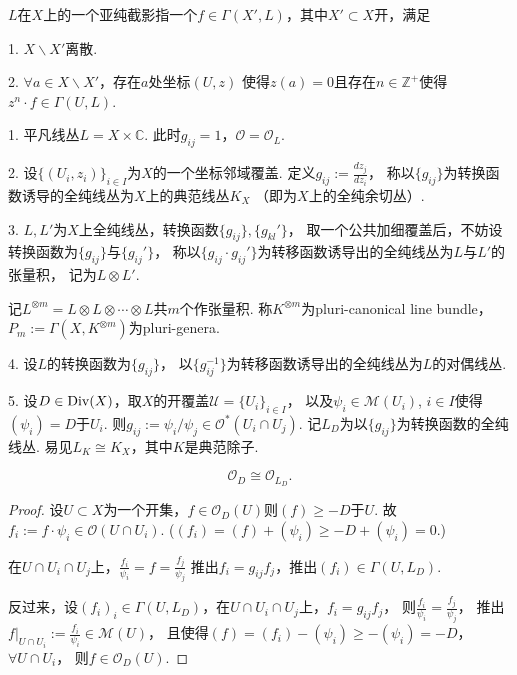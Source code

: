 \begin{definition}
	$L$在$X$上的一个亚纯截影指一个$f\in \Gamma(X',L)$，其中$X'\subset X$开，满足

	1. $X\backslash X'$离散.

	2. $\forall a\in X\backslash X'$，存在$a$处坐标$(U,z)$
    使得$z(a)=0$且存在$n\in \mathbb{Z}^+$使得$z^n\cdot f\in \Gamma(U,L)$.
\end{definition}

\begin{example}
	1. 平凡线丛$L=X\times \mathbb{C}$. 
    此时$g_{ij}=1$，$\mathcal{O}=\mathcal{O}_L$.

	2. 设$\{(U_i,z_i)\}_{i\in I}$为$X$的一个坐标邻域覆盖. 
    定义$g_{ij}:=\frac{dz_j}{dz_i}$，
    称以$\{g_{ij}\}$为转换函数诱导的全纯线丛为$X$上的典范线丛$K_X$
    （即为$X$上的全纯余切丛）.

	3. $L, L'$为$X$上全纯线丛，转换函数$\{g_{ij}\}, \{g_{kl}'\}$，
    取一个公共加细覆盖后，不妨设转换函数为$\{g_{ij}\}$与$\{g_{ij}'\}$，
    称以$\{g_{ij}\cdot g_{ij}'\}$为转移函数诱导出的全纯线丛为$L$与$L'$的张量积，
    记为$L\otimes L'$.

	记$L^{\otimes m}=L\otimes L\otimes \cdots \otimes L$共$m$个作张量积. 
    称$K^{\otimes m}$为pluri-canonical line bundle，$
    P_m:=\Gamma(X, K^{\otimes m})$为pluri-genera.

	4. 设$L$的转换函数为$\{g_{ij}\}$，
    以$\{g_{ij}^{-1}\}$为转移函数诱导出的全纯线丛为$L$的对偶线丛.

	5. 设$D\in \operatorname{Div}(X)$，取$X$的开覆盖$\mathscr{U}=\{U_i\}_{i\in I}$，
    以及$\psi_i\in \mathscr{M}(U_i)$, $i\in I$使得$(\psi_i)=D$于$U_i$. 
    则$g_{ij}:=\psi_i/\psi_j \in \mathcal{O}^*(U_i\cap U_j)$. 
    记$L_D$为以$\{g_{ij}\}$为转换函数的全纯线丛. 易见$L_K\cong K_X$，其中$K$是典范除子.
\end{example}
			
\begin{lemma}
	$$\mathcal{O}_D\cong \mathcal{O}_{L_D}.$$
\end{lemma}
	
\begin{proof}
	设$U\subset X$为一个开集，$f \in \mathcal{O}_D(U)$则$(f)\geq -D$于$U$. 
    故$f_i:=f\cdot \psi_i\in \mathcal{O}(U\cap U_i)$. 
    ($(f_i)=(f)+(\psi_i)\geq -D+(\psi_i)=0$.)

	在$U\cap U_i \cap U_j$上，$\frac{f_i}{\psi_i}=f=\frac{f_j}{\psi_j}$
    推出$f_i=g_{ij}f_j$，推出$(f_i)\in \Gamma(U, L_D)$.

	反过来，设$(f_i)_i\in \Gamma(U,L_D)$，在$U\cap U_i\cap U_j$上，$f_i=g_{ij}f_j$，
    则$\frac{f_i}{\psi_i}=\frac{f_j}{\psi_j}$，
    推出$f|_{U\cap U_i}:=\frac{f_i}{\psi_i}\in \mathscr{M}(U)$，
    且使得$(f)=(f_i)-(\psi_i)\geq -(\psi_i)=-D$，$\forall U\cap U_i$，
    则$f\in \mathcal{O}_D(U)$.
\end{proof}

